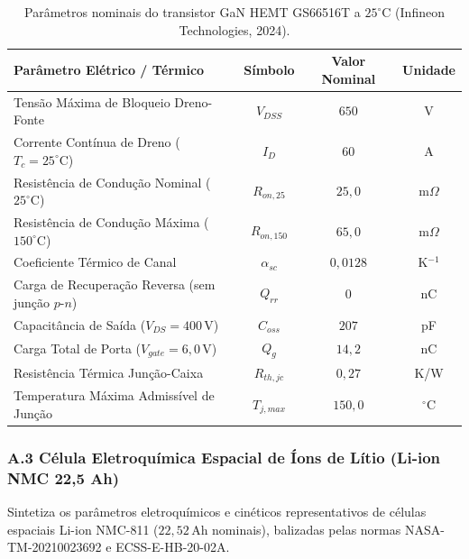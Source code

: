 \begin{table}[!ht]
\centering
\small
\renewcommand{\arraystretch}{0.85}
\caption{Parâmetros nominais do transistor GaN HEMT GS66516T a $25^\circ\text{C}$ (Infineon Technologies, 2024).}
\label{tab:anexo_gan_gs66516t}
\begin{tabular}{lccc}
\hline
\textbf{Parâmetro Elétrico / Térmico} & \textbf{Símbolo} & \textbf{Valor Nominal} & \textbf{Unidade} \\ \hline
Tensão Máxima de Bloqueio Dreno-Fonte & $V_{DSS}$ & $650$ & V \\
Corrente Contínua de Dreno ($T_c = 25^\circ\text{C}$) & $I_D$ & $60$ & A \\
Resistência de Condução Nominal ($25^\circ\text{C}$) & $R_{on,25}$ & $25{,}0$ & m$\Omega$ \\
Resistência de Condução Máxima ($150^\circ\text{C}$) & $R_{on,150}$ & $65{,}0$ & m$\Omega$ \\
Coeficiente Térmico de Canal & $\alpha_{sc}$ & $0{,}0128$ & K$^{-1}$ \\
Carga de Recuperação Reversa (sem junção $p\text{-}n$) & $Q_{rr}$ & $0$ & nC \\
Capacitância de Saída ($V_{DS} = 400\,\mathrm{V}$) & $C_{oss}$ & $207$ & pF \\
Carga Total de Porta ($V_{gate} = 6{,}0\,\mathrm{V}$) & $Q_g$ & $14{,}2$ & nC \\
Resistência Térmica Junção-Caixa & $R_{th,jc}$ & $0{,}27$ & K/W \\
Temperatura Máxima Admissível de Junção & $T_{j,max}$ & $150{,}0$ & $^\circ\text{C}$ \\ \hline
\end{tabular}
\end{table}

\subsubsection*{A.3 Célula Eletroquímica Espacial de Íons de Lítio (Li-ion NMC 22,5 Ah)}
Sintetiza os parâmetros eletroquímicos e cinéticos representativos de células espaciais Li-ion NMC-811 ($22{,}52\,\mathrm{Ah}$ nominais), balizadas pelas normas NASA-TM-20210023692 e ECSS-E-HB-20-02A.

